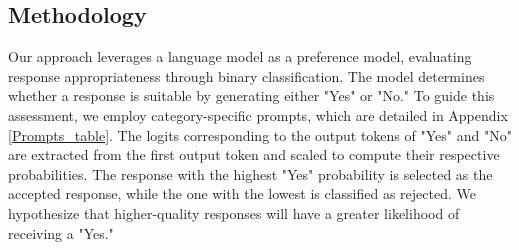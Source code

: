 \subsection{Methodology}
Our approach leverages a language model as a preference model, evaluating response appropriateness through binary classification. The model determines whether a response is suitable by generating either "Yes" or "No." To guide this assessment, we employ category-specific prompts, which are detailed in Appendix \ref{Prompts_table}. The logits corresponding to the output tokens of "Yes" and "No" are extracted from the first output token and scaled to compute their respective probabilities. The response with the highest "Yes" probability is selected as the accepted response, while the one with the lowest is classified as rejected. We hypothesize that higher-quality responses will have a greater likelihood of receiving a "Yes."






